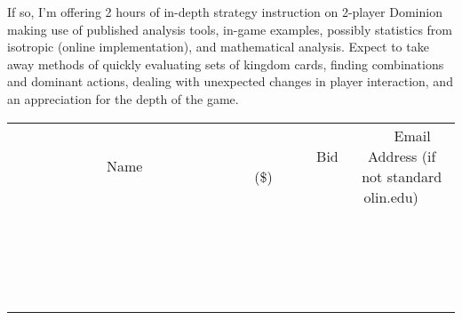 \documentclass[11pt]{article}
\begin{document}
If so, I'm offering 2 hours of in-depth strategy instruction on 2-player Dominion making use of published analysis tools, in-game examples, possibly statistics from isotropic (online implementation), and mathematical analysis.  Expect to take away methods of quickly evaluating sets of kingdom cards, finding combinations and dominant actions, dealing with unexpected changes in player interaction, and an appreciation for the depth of the game.
\\[3ex]
\begin{tabular}{c c c}
~~~~~~~~~~~~~Name~~~~~~~~~~~~~ & ~~~~~~~~~Bid (\$)~~~~~~~~~  & ~~~Email Address (if not standard olin.edu)~~~\\
 & & \\
\hline
 & & \\
\hline
 & & \\
\hline
 & & \\
\hline
 & & \\
\hline
 & & \\
\hline
 & & \\
\hline
 & & \\
\hline
 & & \\
\hline
 & & \\
\hline
 & & \\
\hline
 & & \\
\hline
 & & \\
\hline
 & & \\
\hline
 & & \\
\hline
 & & \\
\hline
 & & \\
\hline
 & & \\
\hline
 & & \\
\hline
\end{tabular}
\newpage
\end{document}
